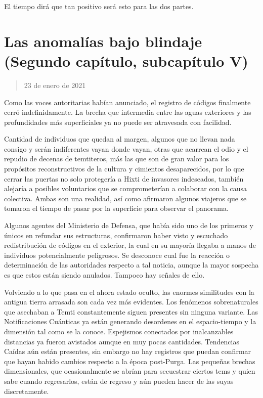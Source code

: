 \documentclass[
  spanish,
]{book}
\begin{document}
El tiempo dirá que tan positivo será esto para las dos partes.

\hypertarget{las-anomaluxedas-bajo-blindaje-segundo-capuxedtulo-subcapuxedtulo-v}{%
\section{Las anomalías bajo blindaje (Segundo capítulo, subcapítulo V)}\label{las-anomaluxedas-bajo-blindaje-segundo-capuxedtulo-subcapuxedtulo-v}}

\begin{quote}
23 de enero de 2021
\end{quote}

Como las voces autoritarias habían anunciado, el registro de códigos finalmente cerró indefinidamente. La brecha que intermedia entre las aguas exteriores y las profundidades más superficiales ya no puede ser atravesada con facilidad.

Cantidad de individuos que quedan al margen, algunos que no llevan nada consigo y serán indiferentes vayan donde vayan, otras que acarrean el odio y el repudio de decenas de temtiteros, más las que son de gran valor para los propósitos reconstructivos de la cultura y cimientos desaparecidos, por lo que cerrar las puertas no solo protegería a Hixti de invasores indeseados, también alejaría a posibles voluntarios que se comprometerían a colaborar con la causa colectiva. Ambas son una realidad, así como afirmaron algunos viajeros que se tomaron el tiempo de pasar por la superficie para observar el panorama.

Algunos agentes del Ministerio de Defensa, que había sido uno de los primeros y únicos en refundar sus estructuras, confirmaron haber visto y escuchado redistribución de códigos en el exterior, la cual en su mayoría llegaba a manos de individuos potencialmente peligrosos. Se desconoce cual fue la reacción o determinación de las autoridades respecto a tal noticia, aunque la mayor sospecha es que estos están siendo anulados. Tampoco hay señales de ello.

Volviendo a lo que pasa en el ahora estado oculto, las enormes similitudes con la antigua tierra arrasada son cada vez más evidentes. Los fenómenos sobrenaturales que asechaban a Temti constantemente siguen presentes sin ninguna variante. Las Notificaciones Cuánticas ya están generando desordenes en el espacio-tiempo y la dimensión tal como se la conoce. Espejismos conectados por inalcanzables distancias ya fueron avistados aunque en muy pocas cantidades. Tendencias Caídas aún están presentes, sin embargo no hay registros que puedan confirmar que hayan habido cambios respecto a la época post-Purga. Las pequeñas brechas dimensionales, que ocasionalmente se abrían para secuestrar ciertos tems y quien sabe cuando regresarlos, están de regreso y aún pueden hacer de las suyas discretamente.
\end{document}
